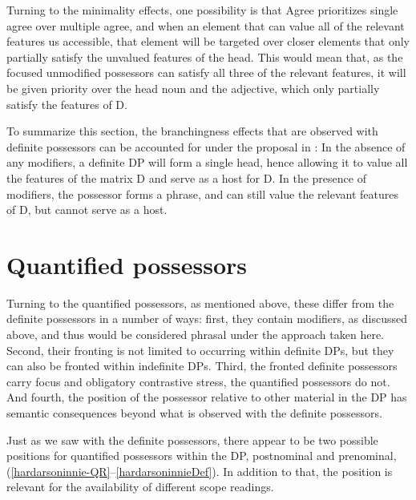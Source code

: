 \documentclass[output=paper,colorlinks,citecolor=brown,
]{langscibook}
\begin{document}
Turning to the minimality effects, one possibility is that Agree prioritizes single agree over multiple agree, and when an element that can value all of the relevant features us accessible, that element will be targeted over closer elements that only partially satisfy the unvalued features of the head. This would mean that, as the focused unmodified possessors can satisfy all three of the relevant features, it will be given priority over the head noun and the adjective, which only partially satisfy the features of D.

To summarize this section, the branchingness effects that are observed with definite possessors can be accounted for under the proposal in \cite{hardarson2020}: In the absence of any modifiers, a definite DP will form a single head, hence allowing it to value all the features of the matrix D and serve as a host for D. In the presence of modifiers, the possessor forms a phrase, and can still value the relevant features of D, but cannot serve as a host.


\section{Quantified possessors}

Turning to the quantified possessors, as mentioned above, these differ from the definite possessors in a number of ways: first, they contain modifiers, as discussed above, and thus would be considered phrasal under the approach taken here. Second, their fronting is not limited to occurring within definite DPs, but they can also be fronted within indefinite DPs. Third, the fronted definite possessors carry focus and obligatory contrastive stress, the quantified possessors do not. And fourth, the position of the possessor relative to other material in the DP has semantic consequences beyond what is observed with the definite possessors.

Just as we saw with the definite possessors, there appear to be two possible positions for quantified possessors within the DP, postnominal and prenominal, (\ref{hardarsoninnie-QR}--\ref{hardarsoninnieDef}). In addition to that, the position is relevant for the availability of different scope readings.
\end{document}
